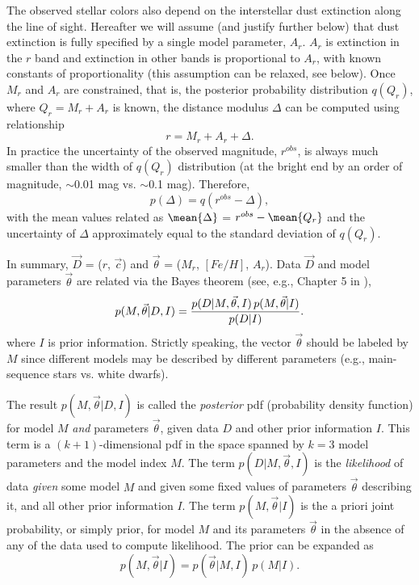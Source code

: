 The observed stellar colors also depend on the interstellar dust extinction along the line of sight. Hereafter
we will assume (and justify further below) that dust extinction is fully specified by a single model parameter, $A_r$.
$A_r$ is extinction in the $r$ band and extinction in other bands is proportional to $A_r$, with known constants
of proportionality (this assumption can be relaxed, see below). Once $M_r$ and $A_r$ are constrained, that is, the
posterior probability distribution $q(Q_r)$, where $Q_r=M_r+A_r$ is known, the distance modulus $\Delta$ can be
computed using relationship
\begin{equation}
  \label{eq:distmod}
                 r = M_r + A_r + \Delta.
\end{equation}
In practice the uncertainty of the observed magnitude, $r^{obs}$, is always much smaller than the width of $q(Q_r)$
distribution (at the bright end by an order of magnitude, $\sim$0.01 mag vs. $\sim$0.1 mag). Therefore,
\begin{equation}
  \label{eq:distmodpdf}
                         p(\Delta) = q(r^{obs} - \Delta),
\end{equation}
with the mean values related as $\mean{\Delta}$ = $r^{obs} - \mean{Q_r}$ and the uncertainty of $\Delta$
approximately equal to the standard deviation of $q(Q_r)$. 

In summary, $\vec{D}$ = ($r$, $\vec{c}$) and $\vec{\theta}$ = ($M_r$, $[Fe/H]$, $A_r$).
Data $\vec{D}$ and model parameters $\vec{\theta}$ are related via the Bayes theorem (see, e.g., Chapter 5 in \citealt{2020sdmm.book.....I}),
\begin{equation}
  \label{eq:BayesFull}
         p(M,\vec{\theta}|D,I) = {  p(D|M,\vec{\theta},I) \, p(M,\vec{\theta}|I) \over p(D|I)}.
\end{equation}
where $I$ is prior information. Strictly speaking, the vector $\vec{\theta}$
should be labeled by $M$ since different models may be described by different parameters (e.g., main-sequence
stars vs. white dwarfs).  

The result $p(M,\vec{\theta}|D,I)$ is called the {\it posterior} pdf (probability density function) for model $M$ {\it and}
parameters $\vec{\theta}$, given data $D$ and other prior information $I$. This term is a $(k+1)$-dimensional
pdf in the space spanned by $k=3$ model parameters and the model index $M$. The term $p(D|M,\vec{\theta},I)$
is the {\it likelihood} of data {\it given} some model $M$ and given some fixed values of
parameters $\vec{\theta}$ describing it, and all other prior information $I$. The term $p(M,\vec{\theta}|I)$
is the a priori joint probability, or simply prior, for model $M$ and its parameters $\vec{\theta}$ in the absence of any
of the data used to compute likelihood. The prior can be expanded as
\begin{equation}
 \label{eq:BayesPriorExpand}
        p(M,\vec{\theta}|I) = p(\vec{\theta}|M,I) \,p(M|I).
\end{equation}

